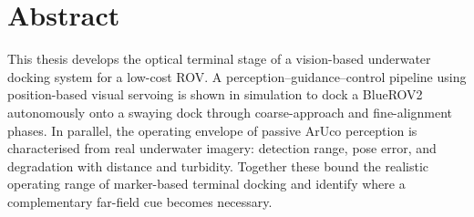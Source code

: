\section*{Abstract}

This thesis develops the optical terminal stage of a vision-based underwater
docking system for a low-cost ROV. A perception--guidance--control pipeline using
position-based visual servoing is shown in simulation to dock a BlueROV2
autonomously onto a swaying dock through coarse-approach and fine-alignment phases.
In parallel, the operating envelope of passive ArUco perception is characterised
from real underwater imagery: detection range, pose error, and degradation with
distance and turbidity. Together these bound the realistic operating range of
marker-based terminal docking and identify where a complementary far-field cue
becomes necessary.
